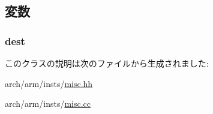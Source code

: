 \subsection{変数}
\hypertarget{classMrsOp_aec72e8e45bdc87abeeeb75d2a8a9a716}{
\subsubsection[{dest}]{ {\bf dest}}}
\label{classMrsOp_aec72e8e45bdc87abeeeb75d2a8a9a716}


このクラスの説明は次のファイルから生成されました:\begin{DoxyCompactItemize}
\item 
arch/arm/insts/\hyperlink{arch_2arm_2insts_2misc_8hh}{misc.hh}\item 
arch/arm/insts/\hyperlink{arch_2arm_2insts_2misc_8cc}{misc.cc}\end{DoxyCompactItemize}
